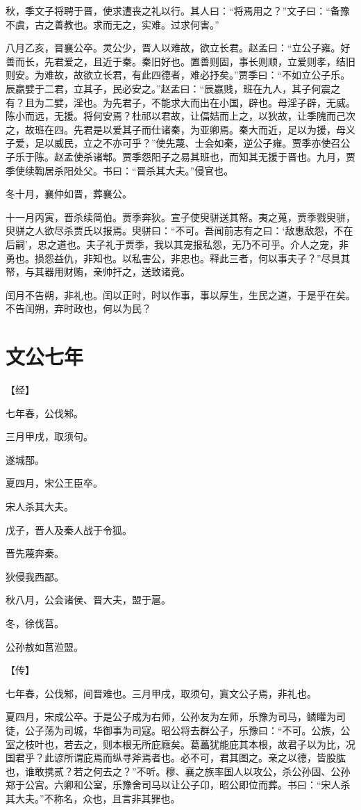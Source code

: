 \documentclass[a4paper,12pt,UTF8,twoside]{ctexbook}
\begin{document}
秋，季文子将聘于晋，使求遭丧之礼以行。其人曰：“将焉用之？”文子曰：“备豫不虞，古之善教也。求而无之，实难。过求何害。”

八月乙亥，晋襄公卒。灵公少，晋人以难故，欲立长君。赵孟曰：“立公子雍。好善而长，先君爱之，且近于秦。秦旧好也。置善则固，事长则顺，立爱则孝，结旧则安。为难故，故欲立长君，有此四德者，难必抒矣。”贾季曰：“不如立公子乐。辰嬴嬖于二君，立其子，民必安之。”赵孟曰：“辰嬴贱，班在九人，其子何震之有？且为二嬖，淫也。为先君子，不能求大而出在小国，辟也。母淫子辟，无威。陈小而远，无援。将何安焉？杜祁以君故，让偪姞而上之，以狄故，让季隗而己次之，故班在四。先君是以爱其子而仕诸秦，为亚卿焉。秦大而近，足以为援，母义子爱，足以威民，立之不亦可乎？”使先蔑、士会如秦，逆公子雍。贾季亦使召公子乐于陈。赵孟使杀诸郫。贾季怨阳子之易其班也，而知其无援于晋也。九月，贾季使续鞫居杀阳处父。书曰：“晋杀其大夫。”侵官也。

冬十月，襄仲如晋，葬襄公。

十一月丙寅，晋杀续简伯。贾季奔狄。宣子使臾骈送其帑。夷之蒐，贾季戮臾骈，臾骈之人欲尽杀贾氏以报焉。臾骈曰：“不可。吾闻前志有之曰：‘敌惠敌怨，不在后嗣’，忠之道也。夫子礼于贾季，我以其宠报私怨，无乃不可乎。介人之宠，非勇也。损怨益仇，非知也。以私害公，非忠也。释此三者，何以事夫子？”尽具其帑，与其器用财贿，亲帅扞之，送致诸竟。

闰月不告朔，非礼也。闰以正时，时以作事，事以厚生，生民之道，于是乎在矣。不告闰朔，弃时政也，何以为民？

\chapter{文公七年}


【经】

七年春，公伐邾。

三月甲戌，取须句。

遂城郚。

夏四月，宋公王臣卒。

宋人杀其大夫。

戊子，晋人及秦人战于令狐。

晋先蔑奔秦。

狄侵我西鄙。

秋八月，公会诸侯、晋大夫，盟于扈。

冬，徐伐莒。

公孙敖如莒涖盟。

【传】

七年春，公伐邾，间晋难也。三月甲戌，取须句，寘文公子焉，非礼也。

夏四月，宋成公卒。于是公子成为右师，公孙友为左师，乐豫为司马，鳞矔为司徒，公子荡为司城，华御事为司寇。昭公将去群公子，乐豫曰：“不可。公族，公室之枝叶也，若去之，则本根无所庇廕矣。葛藟犹能庇其本根，故君子以为比，况国君乎？此谚所谓庇焉而纵寻斧焉者也。必不可，君其图之。亲之以德，皆股肱也，谁敢携贰？若之何去之？”不听。穆、襄之族率国人以攻公，杀公孙固、公孙郑于公宫。六卿和公室，乐豫舍司马以让公子卬，昭公即位而葬。书曰：“宋人杀其大夫。”不称名，众也，且言非其罪也。
\end{document}
